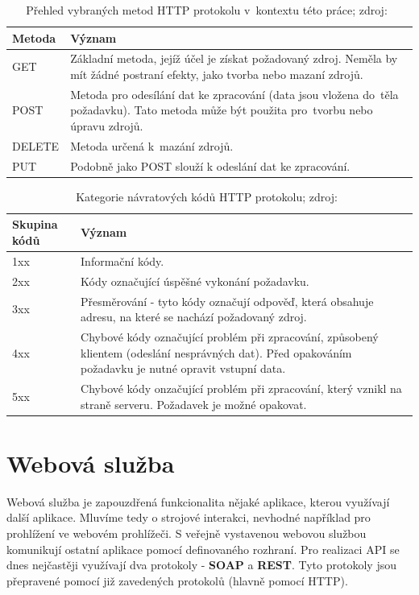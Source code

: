 \begin{table}[ht!]
  \centering
  \begin{tabular}{|l|p{10.1cm}|}
    \hline
    \textbf{Metoda} & \textbf{Význam}\\
    \hline
    GET & Základní metoda, jejíž účel je získat požadovaný zdroj. Neměla by mít žádné postraní efekty, jako tvorba nebo mazaní zdrojů.\\
    \hline
    POST & Metoda pro odesílání dat ke zpracování (data jsou vložena do~těla požadavku). Tato metoda může být použita pro~tvorbu nebo úpravu zdrojů.\\
    \hline
    DELETE & Metoda určená k~mazání zdrojů.\\
    \hline
    PUT & Podobně jako POST slouží k odeslání dat ke zpracování.\\
    \hline
  \end{tabular}
  \caption{Přehled vybraných metod HTTP protokolu v~kontextu této práce; zdroj:~\cite{http_metody}}
  \label{tab:http_metody}
\end{table}

\begin{table}[ht!]
  \centering
  \begin{tabular}{|l|p{9cm}|}
    \hline
    \textbf{Skupina kódů} & \textbf{Význam}\\
    \hline
    1xx & Informační kódy.\\
    \hline
    2xx & Kódy označující úspěšné vykonání požadavku.\\
    \hline
    3xx & Přesměrování - tyto kódy označují odpověď, která obsahuje adresu, na které se nachází požadovaný zdroj.\\
    \hline
    4xx & Chybové kódy označující problém při zpracování, způsobený klientem (odeslání nesprávných dat). Před opakováním požadavku je nutné opravit vstupní data.\\
    \hline
    5xx & Chybové kódy onzačující problém při zpracování, který vznikl na straně serveru. Požadavek je možné opakovat.\\
    \hline
  \end{tabular}
  \caption{Kategorie návratových kódů HTTP protokolu; zdroj:~\cite{rest_vse}}
  \label{tab:http_kody}
\end{table}


\section{Webová služba}

Webová služba je zapouzdřená funkcionalita nějaké aplikace, kterou využívají další aplikace.
Mluvíme tedy o strojové interakci, nevhodné například pro prohlížení ve webovém prohlížeči.
S veřejně vystavenou webovou službou komunikují ostatní aplikace pomocí definovaného rozhraní.
Pro realizaci API se dnes nejčastěji využívají dva protokoly - \textbf{SOAP} a \textbf{REST}.
Tyto protokoly jsou přepravené pomocí již zavedených protokolů (hlavně pomocí HTTP).
